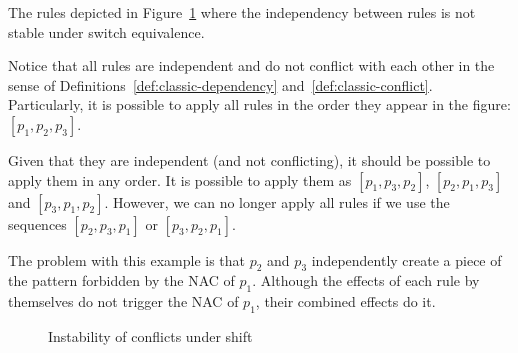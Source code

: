 \begin{example}\label{ex:process:instability}The rules depicted in Figure~\ref{fig:process:instability} where the independency between rules is not stable under switch equivalence.

  Notice that all rules are independent and do not conflict with each other in the sense of Definitions~\ref{def:classic-dependency} and~\ref{def:classic-conflict}. Particularly, it is possible to apply all rules in the order they appear in the figure: $[p_1, p_2, p_3]$.

  Given that they are independent (and not conflicting), it should be possible to apply them in any order. It is possible to apply them as $[p_1, p_3, p_2]$, $[p_2, p_1, p_3]$ and $[p_3, p_1, p_2]$. However, we can no longer apply all rules if we use the sequences $[p_2, p_3, p_1]$ or $[p_3, p_2, p_1]$.

  The problem with this example is that $p_2$ and $p_3$ independently create a piece of the pattern forbidden by the NAC of $p_1$. Although the effects of each rule by themselves do not trigger the NAC of $p_1$, their combined effects do it.

\begin{figure}[!ht]
  \centering
  \caption{Instability of conflicts under shift\\}\label{fig:process:instability}
\end{figure}

\end{example}

